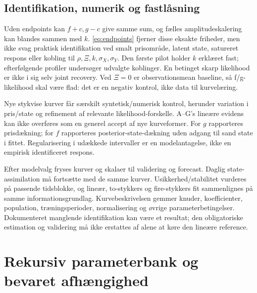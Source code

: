 \subsection{Identifikation, numerik og fastlåsning}
Uden endpoints kan \(f+c,g-c\) give samme sum, og fælles amplitudeskalering kan
blandes sammen med \(k\). \eqref{eq:endpoints} fjerner disse eksakte friheder,
men ikke svag praktisk identifikation ved smalt prisområde, latent state,
satureret respons eller kobling til \(\rho,\Xi,k,\sigma_X,\sigma_Y\).
Den første pilot holder \(k\) erklæret fast; efterfølgende profiler undersøger
udvalgte koblinger. En betinget skarp likelihood er ikke i sig selv joint recovery.
Ved \(\Xi=0\) er observationsmean baseline, så f/g-likelihood skal være flad:
det er en negativ kontrol, ikke data til kurvelæring.

Nye stykvise kurver får særskilt syntetisk/numerisk kontrol, herunder variation i
pris/state og refinement af relevante likelihood-forskelle. A--G's lineære
evidens kan ikke overføres som en generel accept af nye kurveformer.
For \(g\) rapporteres prisdækning; for \(f\) rapporteres posterior-state-dækning
uden adgang til sand state i fittet. Regularisering i udækkede intervaller er en
modelantagelse, ikke en empirisk identificeret respons.

Efter modelvalg fryses kurver og skalaer til validering og forecast. Daglig
state-assimilation må fortsætte med de samme kurver. Usikkerhed/stabilitet vurderes
på passende tidsblokke, og lineær, to-stykkers og fire-stykkers fit sammenlignes
på samme informationsgrundlag. Kurvebeskrivelsen gemmer knuder, koefficienter,
population, træningsperioder, normalisering og øvrige parameterbetingelser.
Dokumenteret manglende identifikation kan være et resultat; den obligatoriske
estimation og validering må ikke erstattes af alene at køre den lineære reference.

\section{Rekursiv parameterbank og bevaret afhængighed}
